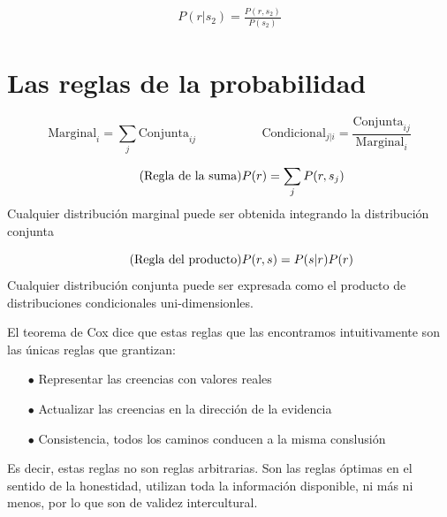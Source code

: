 \documentclass[a4paper,10pt]{book}
\begin{document}
\begin{align*}
 P(r|s_2) = \frac{P(r, s_2)}{P(s_2)}
 \end{align*} 
 


\section{Las reglas de la probabilidad}

\begin{equation*}
  \text{Marginal}_{i} = \sum_j \text{Conjunta}_{ij}  \ \ \ \ \ \ \ \ \  \ \ \ \ \ \ \ \ \ \ \ \ \ \ \  \text{Condicional}_{j|i} = \frac{\text{Conjunta}_{ij}}{\text{Marginal}_{i}}
\end{equation*}


\begin{equation}\tag{\text{Regla de la suma}}
 P(r) = \sum_j P(r,s_j)
\end{equation}
Cualquier distribución marginal puede ser obtenida integrando la distribución conjunta

\begin{equation}\tag{\text{Regla del producto}}
 P(r,s) = P(s|r)P(r)
\end{equation}
Cualquier distribución conjunta puede ser expresada como el producto de distribuciones condicionales uni-dimensionles.

\vspace{0.3cm}

El teorema de Cox \cite{citarbiblio} dice que estas reglas que las encontramos intuitivamente son las únicas reglas que grantizan:
\begin{itemize} \setlength\itemsep{0cm}
 \item[$\bullet$] Representar las creencias con valores reales 
 \item[$\bullet$] Actualizar las creencias en la direcci\'on de la evidencia
 \item[$\bullet$] Consistencia, todos los caminos conducen a la misma conslusión
 \end{itemize}
 
Es decir, estas reglas no son reglas arbitrarias.
Son las reglas óptimas en el sentido de la honestidad, utilizan toda la información disponible, ni más ni menos, por lo que son de validez intercultural.
\end{document}
